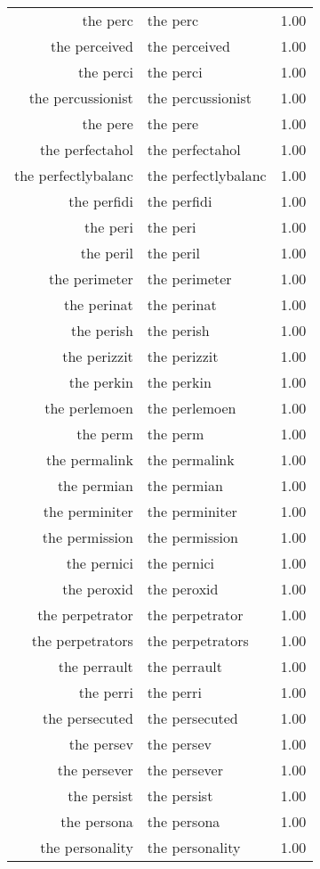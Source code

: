 \begin{table}[ht]
\begin{tabular}{rlr}
  the perc & the perc & 1.00 \\ 
  the perceived & the perceived & 1.00 \\ 
  the perci & the perci & 1.00 \\ 
  the percussionist & the percussionist & 1.00 \\ 
  the pere & the pere & 1.00 \\ 
  the perfectahol & the perfectahol & 1.00 \\ 
  the perfectlybalanc & the perfectlybalanc & 1.00 \\ 
  the perfidi & the perfidi & 1.00 \\ 
  the peri & the peri & 1.00 \\ 
  the peril & the peril & 1.00 \\ 
  the perimeter & the perimeter & 1.00 \\ 
  the perinat & the perinat & 1.00 \\ 
  the perish & the perish & 1.00 \\ 
  the perizzit & the perizzit & 1.00 \\ 
  the perkin & the perkin & 1.00 \\ 
  the perlemoen & the perlemoen & 1.00 \\ 
  the perm & the perm & 1.00 \\ 
  the permalink & the permalink & 1.00 \\ 
  the permian & the permian & 1.00 \\ 
  the perminiter & the perminiter & 1.00 \\ 
  the permission & the permission & 1.00 \\ 
  the pernici & the pernici & 1.00 \\ 
  the peroxid & the peroxid & 1.00 \\ 
  the perpetrator & the perpetrator & 1.00 \\ 
  the perpetrators & the perpetrators & 1.00 \\ 
  the perrault & the perrault & 1.00 \\ 
  the perri & the perri & 1.00 \\ 
  the persecuted & the persecuted & 1.00 \\ 
  the persev & the persev & 1.00 \\ 
  the persever & the persever & 1.00 \\ 
  the persist & the persist & 1.00 \\ 
  the persona & the persona & 1.00 \\ 
  the personality & the personality & 1.00 \\ 

\end{tabular}
\end{table}

